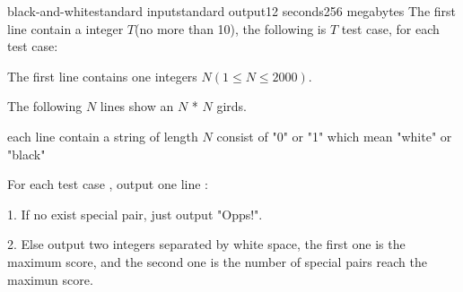 \begin{problem}{black-and-white}{standard input}{standard output}{12 seconds}{256 megabytes}
\InputFile
The first line contain a integer $T$(no more than 10), the following is $T$ test case, for each test case:

The first line contains one integers $N(1 \le N \le 2000)$.

The following $N$ lines show an $N$ * $N$ girds. 

each line contain a string of length $N$ consist of "0" or "1" which mean "white" or "black"


\OutputFile
For each test case , output one line :

1. If no exist special pair, just output "Opps!".

2. Else output two integers separated by white space, the first one is the maximum score, and the second one is the number of special pairs reach the maximun score. 

\Example

\begin{example}
%
\end{example}

\end{problem}

